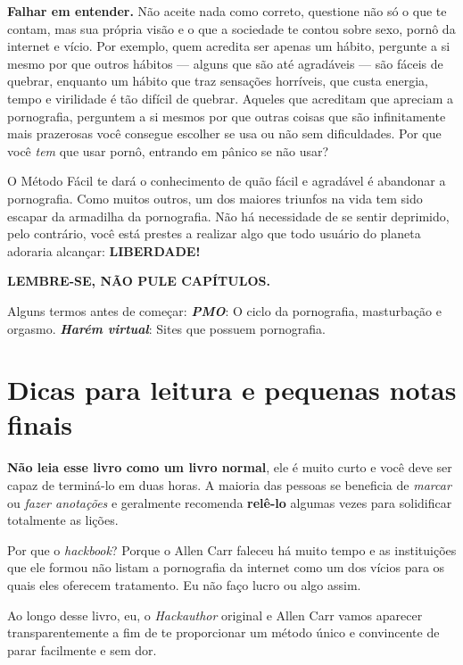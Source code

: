 \documentclass[
  spanish,
  openany]{book}
\begin{document}
\textbf{Falhar em entender.} Não aceite nada como correto, questione não só o que te contam, mas sua própria visão e o que a sociedade te contou sobre sexo, pornô da internet e vício. Por exemplo, quem acredita ser apenas um hábito, pergunte a si mesmo por que outros hábitos --- alguns que são até agradáveis --- são fáceis de quebrar, enquanto um hábito que traz sensações horríveis, que custa energia, tempo e virilidade é tão difícil de quebrar. Aqueles que acreditam que apreciam a pornografia, perguntem a si mesmos por que outras coisas que são infinitamente mais prazerosas você consegue escolher se usa ou não sem dificuldades. Por que você \emph{tem} que usar pornô, entrando em pânico se não usar?

O Método Fácil te dará o conhecimento de quão fácil e agradável é abandonar a pornografia. Como muitos outros, um dos maiores triunfos na vida tem sido escapar da armadilha da pornografia. Não há necessidade de se sentir deprimido, pelo contrário, você está prestes a realizar algo que todo usuário do planeta adoraria alcançar: \textbf{LIBERDADE!}

\textbf{LEMBRE-SE, NÃO PULE CAPÍTULOS.}

Alguns termos antes de começar:
\textbf{\emph{PMO}}: O ciclo da pornografia, masturbação e orgasmo.
\textbf{\emph{Harém virtual}}: Sites que possuem pornografia.

\hypertarget{dicas-para-leitura-e-pequenas-notas-finais}{%
\section{Dicas para leitura e pequenas notas finais}\label{dicas-para-leitura-e-pequenas-notas-finais}}

\textbf{Não leia esse livro como um livro normal}, ele é muito curto e você deve ser capaz de terminá-lo em duas horas. A maioria das pessoas se beneficia de \emph{marcar} ou \emph{fazer anotações} e geralmente recomenda \textbf{relê-lo} algumas vezes para solidificar totalmente as lições.

Por que o \emph{hackbook}? Porque o Allen Carr faleceu há muito tempo e as instituições que ele formou não listam a pornografia da internet como um dos vícios para os quais eles oferecem tratamento. Eu não faço lucro ou algo assim.

Ao longo desse livro, eu, o \emph{Hackauthor} original e Allen Carr vamos aparecer transparentemente a fim de te proporcionar um método único e convincente de parar facilmente e sem dor.
\end{document}

